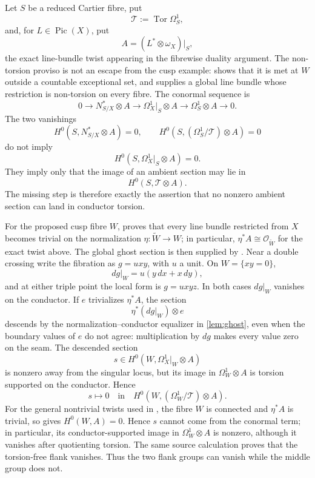 \documentclass[11pt,reqno]{amsart}
\numberwithin{equation}{section}
\newcommand{\Pic}{\operatorname{Pic}}
\newcommand{\Tor}{\operatorname{Tor}}
\theoremstyle{definition}
\begin{document}
Let $S$ be a reduced Cartier fibre, put
\[
\mathcal T:=\Tor\Omega_S^1,
\]
and, for $L\in\Pic(X)$, put
\[
A=(L^*\otimes\omega_X)|_S,
\]
the exact line-bundle twist appearing in the fibrewise duality argument. The non-torsion proviso is not an escape from the cusp example: \cite[Thm.~10.5(b)]{S6} shows that it is met at $W$ outside a countable exceptional set, and \cite[Prop.~10.8]{S6} supplies a global line bundle whose restriction is non-torsion on every fibre. The conormal sequence is
\begin{equation}\label{eq:cdp-conormal}
0\longrightarrow N_{S/X}^*\otimes A
\longrightarrow \Omega_X^1|_S\otimes A
\longrightarrow \Omega_S^1\otimes A
\longrightarrow0.
\end{equation}
The two vanishings
\[
H^0(S,N_{S/X}^*\otimes A)=0,
\qquad
H^0\!\left(S,(\Omega_S^1/\mathcal T)\otimes A\right)=0
\]
do not imply
\[
H^0(S,\Omega_X^1|_S\otimes A)=0.
\]
They imply only that the image of an ambient section may lie in
\[
H^0(S,\mathcal T\otimes A).
\]
The missing step is therefore exactly the assertion that no nonzero ambient section can land in conductor torsion.

For the proposed cusp fibre $W$, \cite[Thm.~10.5, Step~1]{S6} proves that every line bundle restricted from $X$ becomes trivial on the normalization $\eta:\widetilde W\to W$; in particular, $\eta^*A\cong\mathcal O_{\widetilde W}$ for the exact twist above. The global ghost section is then supplied by \cite[Lem.~10.3(a)--(c)]{S6}. Near a double crossing write the fibration as $g=uxy$, with $u$ a unit. On $W=\{xy=0\}$,
\[
dg|_W=u(y\,dx+x\,dy),
\]
and at either triple point the local form is $g=uxyz$. In both cases $dg|_W$ vanishes on the conductor. If $e$ trivializes $\eta^*A$, the section
\[
\eta^*(dg|_W)\otimes e
\]
descends by the normalization--conductor equalizer in \cref{lem:ghost}, even when the boundary values of $e$ do not agree: multiplication by $dg$ makes every value zero on the seam. The descended section
\[
s\in H^0(W,\Omega_X^1|_W\otimes A)
\]
is nonzero away from the singular locus, but its image in $\Omega_W^1\otimes A$ is torsion supported on the conductor. Hence
\[
s\longmapsto0
\quad\text{in}\quad
H^0\!\left(W,(\Omega_W^1/\mathcal T)\otimes A\right).
\]
For the general nontrivial twists used in \cite[\S10.4]{S6}, the fibre $W$ is connected and $\eta^*A$ is trivial, so \cite[Lem.~10.3(c)]{S6} gives $H^0(W,A)=0$. Hence $s$ cannot come from the conormal term; in particular, its conductor-supported image in $\Omega_W^1\otimes A$ is nonzero, although it vanishes after quotienting torsion. The same source calculation proves that the torsion-free flank vanishes. Thus the two flank groups can vanish while the middle group does not.
\end{document}
